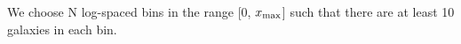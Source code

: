 We choose N log-spaced bins in the range [0, $x_{\rm max}$] such that there are at least 10 galaxies in each bin.